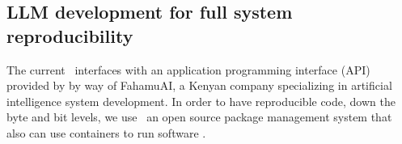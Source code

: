 \subsection{LLM development for full system reproducibility}
The current \project\ interfaces with an application programming interface (API) provided by \openai by way of FahamuAI, a Kenyan company specializing in artificial intelligence system development.
In order to have reproducible code, down the byte and bit levels, we use \guix\, an open source package management system that also can use containers to run software \cite{Vallet:2022_guix}.